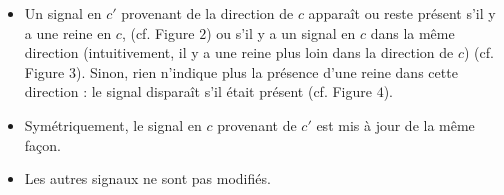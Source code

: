 \documentclass[11pt, openany]{article}
\begin{document}
 \begin{itemize} 

\item{%
Un signal en $c'$ provenant de la direction de $c$ apparaît ou reste présent s'il y a une reine en $c$, (cf. Figure $2$) ou s'il y a un signal en $c$ dans la même direction (intuitivement, il y a une reine plus loin dans la direction de $c$) (cf. Figure $3$). Sinon, rien n'indique plus la présence d'une reine dans cette direction : le signal disparaît s'il était présent (cf. Figure $4$). }

\item{ Symétriquement, le signal en $c$ provenant de $c'$ est mis à jour de la même façon.}

\item{ Les autres signaux ne sont pas modifiés. }
  


\end{itemize}
\end{document}
